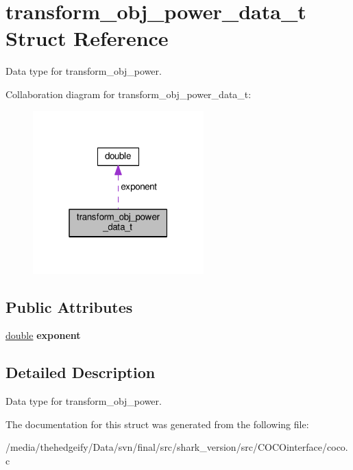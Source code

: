 \hypertarget{structtransform__obj__power__data__t}{}\section{transform\+\_\+obj\+\_\+power\+\_\+data\+\_\+t Struct Reference}
\label{structtransform__obj__power__data__t}


Data type for transform\+\_\+obj\+\_\+power.  




Collaboration diagram for transform\+\_\+obj\+\_\+power\+\_\+data\+\_\+t\+:\nopagebreak
\begin{figure}[H]
\begin{center}
\leavevmode
\includegraphics[width=187pt]{structtransform__obj__power__data__t__coll__graph}
\end{center}
\end{figure}
\subsection*{Public Attributes}
\begin{DoxyCompactItemize}
\item 
\hyperlink{classdouble}{double} {\bfseries exponent}\hypertarget{structtransform__obj__power__data__t_a05c3c16f4f75fc5a8bbb1b42dac2ed68}{}\label{structtransform__obj__power__data__t_a05c3c16f4f75fc5a8bbb1b42dac2ed68}

\end{DoxyCompactItemize}


\subsection{Detailed Description}
Data type for transform\+\_\+obj\+\_\+power. 

The documentation for this struct was generated from the following file\+:\begin{DoxyCompactItemize}
\item 
/media/thehedgeify/\+Data/svn/final/src/shark\+\_\+version/src/\+C\+O\+C\+Ointerface/coco.\+c\end{DoxyCompactItemize}
